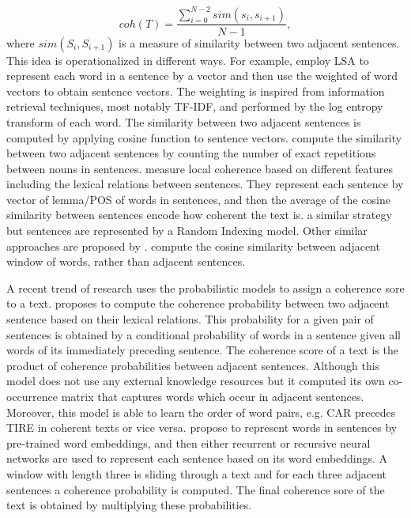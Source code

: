 \begin{equation}
coh(T) = \frac{\sum_{i=0}^{N-2}sim(s_i,s_{i+1})}{N-1},
\end{equation} 
%
where $sim(S_i, S_{i+1})$ is a measure of similarity between two adjacent sentences. 
This idea is operationalized in different ways.
For example,  employ LSA to represent each word in a sentence by a vector and then use the weighted of word vectors to obtain sentence vectors. 
The weighting is inspired from information retrieval techniques, most notably TF-IDF, and performed by the log entropy transform of each word. 
The similarity between two adjacent sentences is computed by applying cosine function to sentence vectors. 
 compute the similarity between two adjacent sentences by counting the number of exact repetitions between nouns in sentences. 
 measure local coherence based on different features including the lexical relations between sentences. 
They represent each sentence by vector of lemma/POS of words in sentences, and then the average of the cosine similarity between sentences encode how coherent the text is. 
  a similar strategy but sentences are represented by a Random Indexing model.
Other similar approaches are proposed by \cite{kazantseva14}. 
 compute the cosine similarity between adjacent window of words, rather than adjacent sentences. 

A recent trend of research uses the probabilistic models to assign a coherence sore to a text. 
 proposes to compute the coherence probability between two adjacent sentence based on their lexical relations. 
This probability for a given pair of sentences is obtained by a conditional probability of words in a sentence given all words of its immediately preceding sentence. 
The coherence score of a text is the product of coherence probabilities between adjacent sentences. 
Although this model does not use any external knowledge resources but it computed its own co-occurrence matrix that captures words which occur in adjacent sentences. 
Moreover, this model is able to learn the order of word pairs, e.g. CAR precedes TIRE in coherent texts or vice versa. 
 propose to represent words in sentences by pre-trained word embeddings, and then either recurrent or recursive neural networks are used to represent each sentence based on its word embeddings. 
A window with length three is sliding through a text and for each three adjacent sentences a coherence probability is computed. 
The final coherence sore of the text is obtained by multiplying these probabilities. 


